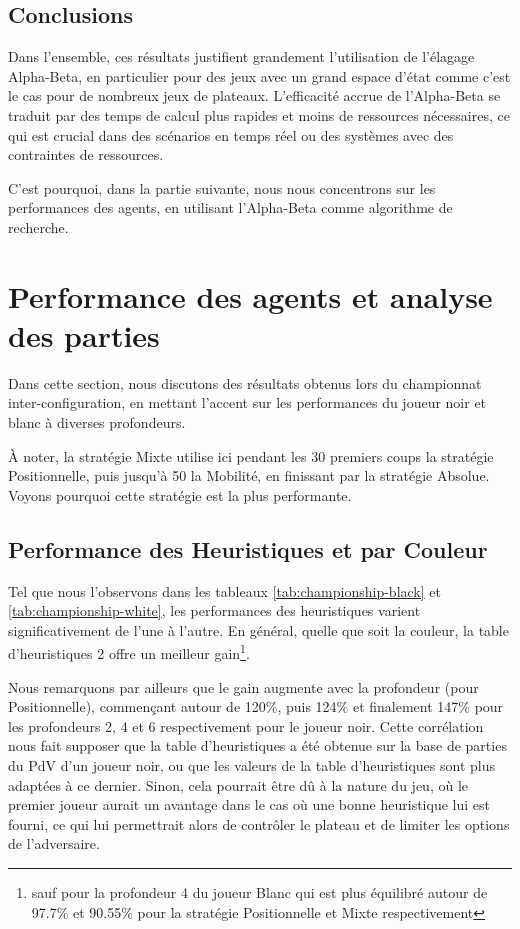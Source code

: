 \subsection*{Conclusions}

Dans l'ensemble, ces résultats justifient grandement l'utilisation de l'élagage Alpha-Beta, en particulier pour des jeux avec un grand espace d'état comme c'est le cas pour de nombreux jeux de plateaux. L'efficacité accrue de l'Alpha-Beta se traduit par des temps de calcul plus rapides et moins de ressources nécessaires, ce qui est crucial dans des scénarios en temps réel ou des systèmes avec des contraintes de ressources.

C'est pourquoi, dans la partie suivante, nous nous concentrons sur les performances des agents, en utilisant l'Alpha-Beta comme algorithme de recherche.

\pagebreak
\section{Performance des agents et analyse des parties}

Dans cette section, nous discutons des résultats obtenus lors du championnat inter-configuration, en mettant l'accent sur les performances du joueur noir et blanc à diverses profondeurs. 

À noter, la stratégie Mixte utilise ici pendant les 30 premiers coups la stratégie Positionnelle, puis jusqu'à 50 la Mobilité, en finissant par la stratégie Absolue. Voyons pourquoi cette stratégie est la plus performante.

\subsection{Performance des Heuristiques et par Couleur}
Tel que nous l'observons dans les tableaux \ref{tab:championship-black} et \ref{tab:championship-white}, les performances des heuristiques varient significativement de l'une à l'autre. En général, quelle que soit la couleur, la table d'heuristiques 2 offre un meilleur gain\footnote{sauf pour la profondeur 4 du joueur Blanc qui est plus équilibré autour de 97.7\% et 90.55\% pour la stratégie Positionnelle et Mixte respectivement}. 

Nous remarquons par ailleurs que le gain augmente avec la profondeur (pour Positionnelle), commençant autour de 120\%, puis 124\% et finalement 147\% pour les profondeurs 2, 4 et 6 respectivement pour le joueur noir. Cette corrélation nous fait supposer que la table d'heuristiques a été obtenue sur la base de parties du \ac{PdV} d'un joueur noir, ou que les valeurs de la table d'heuristiques sont plus adaptées à ce dernier. Sinon, cela pourrait être dû à la nature du jeu, où le premier joueur aurait un avantage dans le cas où une bonne heuristique lui est fourni, ce qui lui permettrait alors de contrôler le plateau et de limiter les options de l'adversaire.

